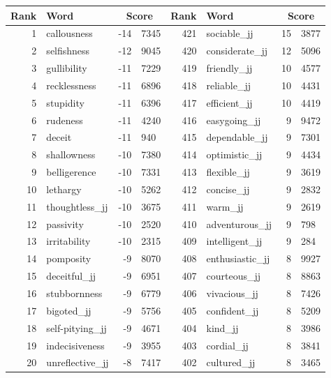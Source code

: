 \begin{table}[tbp]
    \begin{tabular}{| rlr@{.}l | rlr@{.}l |}
    \hline
    \textbf{Rank} & \textbf{Word} & \multicolumn{2}{c|}{\textbf{Score}} & \textbf{Rank} & \textbf{Word} & \multicolumn{2}{c|}{\textbf{Score}} \\
    \hline
    1 & callousness & -14 & 7345    &    421 & sociable\_jj & 15 & 3877 \\
    2 & selfishness & -12 & 9045    &    420 & considerate\_jj & 12 & 5096 \\
    3 & gullibility & -11 & 7229    &    419 & friendly\_jj & 10 & 4577 \\
    4 & recklessness & -11 & 6896    &    418 & reliable\_jj & 10 & 4431 \\
    5 & stupidity & -11 & 6396    &    417 & efficient\_jj & 10 & 4419 \\
    6 & rudeness & -11 & 4240    &    416 & easygoing\_jj & 9 & 9472 \\
    7 & deceit & -11 & 940    &    415 & dependable\_jj & 9 & 7301 \\
    8 & shallowness & -10 & 7380    &    414 & optimistic\_jj & 9 & 4434 \\
    9 & belligerence & -10 & 7331    &    413 & flexible\_jj & 9 & 3619 \\
    10 & lethargy & -10 & 5262    &    412 & concise\_jj & 9 & 2832 \\
    11 & thoughtless\_jj & -10 & 3675    &    411 & warm\_jj & 9 & 2619 \\
    12 & passivity & -10 & 2520    &    410 & adventurous\_jj & 9 & 798 \\
    13 & irritability & -10 & 2315    &    409 & intelligent\_jj & 9 & 284 \\
    14 & pomposity & -9 & 8070    &    408 & enthusiastic\_jj & 8 & 9927 \\
    15 & deceitful\_jj & -9 & 6951    &    407 & courteous\_jj & 8 & 8863 \\
    16 & stubbornness & -9 & 6779    &    406 & vivacious\_jj & 8 & 7426 \\
    17 & bigoted\_jj & -9 & 5756    &    405 & confident\_jj & 8 & 5209 \\
    18 & self-pitying\_jj & -9 & 4671    &    404 & kind\_jj & 8 & 3986 \\
    19 & indecisiveness & -9 & 3955    &    403 & cordial\_jj & 8 & 3841 \\
    20 & unreflective\_jj & -8 & 7417    &    402 & cultured\_jj & 8 & 3465 \\

\end{tabular}
\end{table}
